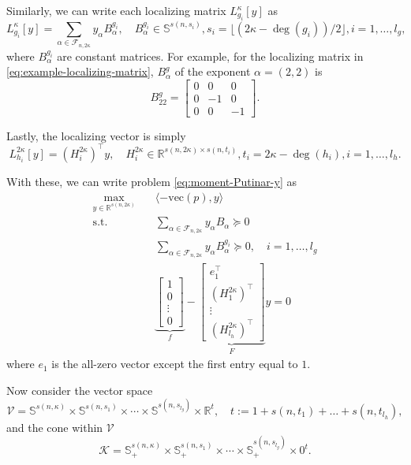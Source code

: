 \documentclass[
]{book}
\theoremstyle{definition}
\theoremstyle{definition}
\theoremstyle{definition}
\theoremstyle{definition}
\theoremstyle{remark}
\begin{document}
Similarly, we can write each localizing matrix \(L_{g_i}^\kappa[y]\) as
\[
L_{g_i}^{\kappa}[y] = \sum_{\alpha \in \mathcal{F}_{n,2\kappa}} y_{\alpha} B^{g_i}_\alpha, \quad B_{\alpha}^{g_i} \in \mathbb{S}^{s(n,s_i)}, s_i = \lfloor  (2\kappa - \deg(g_i))/2  \rfloor,i=1,\dots,l_g,
\]
where \(B_{\alpha}^{g_i}\) are constant matrices. For example, for the localizing matrix in \eqref{eq:example-localizing-matrix}, \(B_\alpha^g\) of the exponent \(\alpha = (2,2)\) is
\[
B_{22}^{g} = \begin{bmatrix}
0 & 0 & 0 \\
0 & -1 & 0 \\
0 & 0 & -1
\end{bmatrix}.
\]

Lastly, the localizing vector is simply
\[
L_{h_i}^{2\kappa}[y] = (H^{2\kappa}_i)^\top y, \quad H^{2\kappa}_i \in \mathbb{R}^{s(n,2\kappa) \times s(n,t_i)}, t_i = 2\kappa - \deg(h_i), i=1,\dots,l_h.
\]

With these, we can write problem \eqref{eq:moment-Putinar-y} as
\begin{equation}
\begin{split}
\max_{y \in \mathbb{R}^{s(n,2\kappa)}} & \quad \langle - \mathrm{vec}(p), y \rangle \\
\mathrm{s.t.}& \quad \sum_{\alpha \in \mathcal{F}_{n,2\kappa}} y_\alpha B_\alpha \succeq 0 \\
& \quad \sum_{\alpha \in \mathcal{F}_{n,2\kappa}} y_\alpha B_\alpha^{g_i} \succeq 0, \quad i=1,\dots,l_g \\
& \quad \underbrace{\begin{bmatrix} 1 \\
0 \\ \vdots \\ 0 \end{bmatrix}}_{f} - \underbrace{\begin{bmatrix} 
e_1^\top\\
(H^{2\kappa}_1)^\top\\
\vdots \\
(H^{2\kappa}_{l_h})^\top
\end{bmatrix}}_{F} y = 0
\end{split}
\label{eq:moment-Putinar-y-1}
\end{equation}
where \(e_1\) is the all-zero vector except the first entry equal to \(1\).

Now consider the vector space
\[
\mathcal{V}= \mathbb{S}^{s(n,\kappa)} \times \mathbb{S}^{s(n,s_1)} \times \cdots \times \mathbb{S}^{s(n,s_{l_g})} \times \mathbb{R}^{t}, \quad t:= 1 + s(n,t_1) + \dots + s(n,t_{l_h}),
\]
and the cone within \(\mathcal{V}\)
\[
\mathcal{K}= \mathbb{S}^{s(n,\kappa)}_{+} \times \mathbb{S}^{s(n,s_1)}_{+} \times \cdots \times \mathbb{S}^{s(n,s_{l_g})}_{+} \times 0^{t}.
\]
\end{document}
